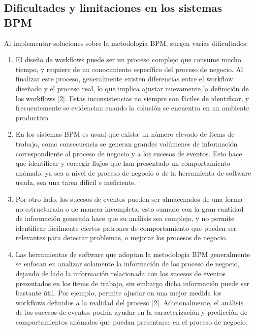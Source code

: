 \subsection{Dificultades y limitaciones en los sistemas BPM} %
\label{section1.2.1}

Al implementar soluciones sobre la metodología BPM, surgen varias dificultades:

\begin{enumerate}
    \item El diseño de workflows puede ser un proceso complejo que consume mucho tiempo, y requiere de un conocimiento específico del proceso de negocio. Al finalizar este proceso, generalmente existen diferencias entre el workflow diseñado y el proceso real, lo que implica ajustar nuevamente la definición de los workflows [2]. Estas inconsistencias no siempre son fáciles de identificar, y frecuentemente se evidencian cuando la solución se encuentra en un ambiente productivo.
    
    \item En los sistemas BPM es usual que exista un número elevado de ítems de trabajo, como consecuencia se generan grandes volúmenes de información correspondiente al proceso de negocio y a los sucesos de eventos. Esto hace que identificar y corregir flujos que han presentado un comportamiento anómalo, ya sea a nivel de proceso de negocio o de la herramienta de software usada, sea una tarea difícil e ineficiente.
    
    \item Por otro lado, los sucesos de eventos pueden ser almacenados de una forma no estructurada o de manera incompleta, esto sumado con la gran cantidad de información generada hace que su análisis sea complejo, y no permite identificar fácilmente ciertos patrones de comportamiento que pueden ser relevantes para detectar problemas, o mejorar los procesos de negocio.
    
    \item Las herramientas de software que adoptan la metodología BPM generalmente se enfocan en analizar solamente la información de los proceso de negocio, dejando de lado la información relacionada con los sucesos de eventos presentados en los ítems de trabajo, sin embargo dicha información puede ser bastante útil. Por ejemplo, permite ajustar en una mejor medida los workflows definidos a la realidad del proceso [2]. Adicionalmente, el análisis de los sucesos de eventos podría ayudar en la caracterización y predicción de comportamientos anómalos que puedan presentarse en el proceso de negocio.
    
\end{enumerate}

